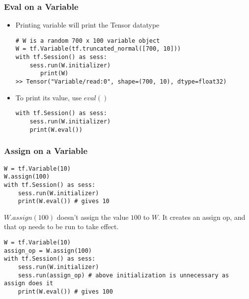\begin{frame}[fragile] \frametitle{Eval on a Variable}
\begin{itemize}
\item Printing variable will print the Tensor datatype
\begin{lstlisting}
# W is a random 700 x 100 variable object
W = tf.Variable(tf.truncated_normal([700, 10]))
with tf.Session() as sess:
	sess.run(W.initializer)
       print(W)
>> Tensor("Variable/read:0", shape=(700, 10), dtype=float32)
\end{lstlisting}
\item To print its value, use $eval()$
\begin{lstlisting}
with tf.Session() as sess:
    sess.run(W.initializer)
    print(W.eval())
\end{lstlisting}
\end{itemize}

\end{frame}


\begin{frame}[fragile] \frametitle{Assign on a Variable}

\begin{lstlisting}
W = tf.Variable(10)
W.assign(100)
with tf.Session() as sess:
	sess.run(W.initializer)
	print(W.eval()) # gives 10
\end{lstlisting}

$W.assign(100)$ doesn't assign the value $100$ to $W$. It creates an assign op, and that op needs to be run to take effect.

\begin{lstlisting}
W = tf.Variable(10)
assign_op = W.assign(100)
with tf.Session() as sess:
	sess.run(W.initializer)
	sess.run(assign_op) # above initialization is unnecessary as assign does it
	print(W.eval()) # gives 100
\end{lstlisting}

\end{frame}


